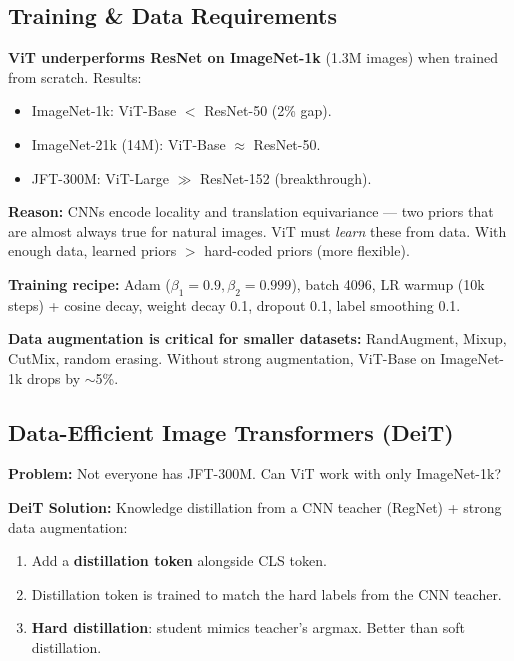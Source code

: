 \subsection{Training \& Data Requirements}

\begin{warnbox}
\textbf{ViT underperforms ResNet on ImageNet-1k} (1.3M images) when trained from scratch. Results:
\begin{itemize}
\item ImageNet-1k: ViT-Base $<$ ResNet-50 (2\% gap).
\item ImageNet-21k (14M): ViT-Base $\approx$ ResNet-50.
\item JFT-300M: ViT-Large $\gg$ ResNet-152 (breakthrough).
\end{itemize}
\textbf{Reason:} CNNs encode locality and translation equivariance — two priors that are almost always true for natural images. ViT must \emph{learn} these from data. With enough data, learned priors $>$ hard-coded priors (more flexible).
\end{warnbox}

\textbf{Training recipe:} Adam ($\beta_1{=}0.9, \beta_2{=}0.999$), batch 4096, LR warmup (10k steps) + cosine decay, weight decay 0.1, dropout 0.1, label smoothing 0.1.

\textbf{Data augmentation is critical for smaller datasets:} RandAugment, Mixup, CutMix, random erasing. Without strong augmentation, ViT-Base on ImageNet-1k drops by $\sim$5\%.

\subsection{Data-Efficient Image Transformers (DeiT)}

\textbf{Problem:} Not everyone has JFT-300M. Can ViT work with only ImageNet-1k?

\textbf{DeiT Solution:} Knowledge distillation from a CNN teacher (RegNet) + strong data augmentation:
\begin{enumerate}
\item Add a \textbf{distillation token} alongside CLS token.
\item Distillation token is trained to match the hard labels from the CNN teacher.
\item \textbf{Hard distillation}: student mimics teacher's argmax. Better than soft distillation.
\end{enumerate}

